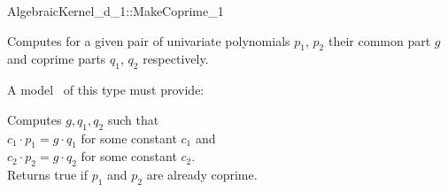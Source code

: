 \begin{ccRefConcept}{AlgebraicKernel_d_1::MakeCoprime_1}

\ccDefinition
Computes for a given pair of univariate polynomials $p_1$, $p_2$ their
common part $g$ and coprime parts $q_1$, $q_2$ respectively.

\ccRefines 
{} 

A model \ccVar\ of this type must provide:

{ Computes $g, q_1, q_2$ such that\\
$c_1 \cdot p_1 =  g \cdot q_1$ for some constant $c_1$ and\\
$c_2 \cdot p_2 =  g \cdot q_2$ for some constant $c_2$.\\
Returns true if $p_1$ and $p_2$ are already coprime. 
}

\ccSeeAlso

\end{ccRefConcept}
